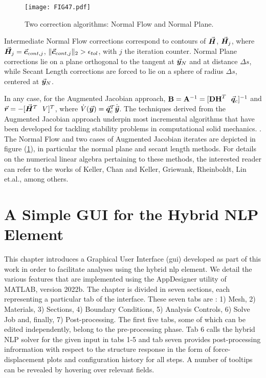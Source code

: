 \begin{appendices}
\begin{figure}[t]
	\centering
	\texttt{[image: FIG47.pdf]}
	\caption{Two correction algorithms: Normal Flow and Normal Plane.}
	\label{fig:FIG47}
\end{figure}

Intermediate Normal Flow corrections correspond to
contours of $\vec{\bm{H}}$, $\vec{\bm{H}}_j$, where $\vec{\bm{H}}_j=\vec{\bm{c}}_{cont,j}$, 
$\Vert
\vec{\bm{c}}_{cont,j}\Vert_2>\epsilon_{tol}$, with $j$ the iteration counter. 
Normal Plane
corrections lie on a plane orthogonal to the tangent at $\vec{\bm{y}}_N$ and at
distance $\Delta s$, while Secant Length corrections are forced to lie on a
sphere of radius $\Delta s$, centered at $\vec{\bm{y}}_N$.

In any case, for the Augmented Jacobian approach,  $\mathbf{B} = 
\mathbf{A}^{-1}=[\mathbf{DH}^T\ \ \vec{\bm{q}}_c]^{-1}$ and
$\vec{\bm{r}} = -[\vec{\bm{H}}^T\ \ V]^T$, where
$\dot{V}(\vec{\bm{y}})=\vec{\bm{q}}_c^T\dot{\vec{\bm{y}}}$.
The techniques derived from the Augmented Jacobian
approach underpin most incremental algorithms that have been developed 
for tackling stability problems in computational solid mechanics.
\cite{Wempner:1971,Riks:1972,Riks:1979,Crisfield3,Ramm:1981}. The Normal
Flow and two cases of Augmented Jacobian iterates are depicted in 
figure (\ref{fig:FIG47}), in particular the normal plane and secant length
methods. For details on the numerical linear algebra pertaining to these
methods, the interested reader can refer to the works of 
Keller\cite{Keller:1978,Keller:1983}, 
Chan and Keller\cite{ChanKeller:1982}, Griewank\cite{Griewank:1985},
Rheinboldt\cite{Rheinboldt:1983B}, Lin et.al.\cite{Lin:1987}, among others. 


\chapter{A Simple GUI for the Hybrid NLP Element}\label{appendix:APPENDIX_G}


This chapter introduces a Graphical User Interface (\acrshort{gui}) developed 
as part of 
this work in order to 
facilitate analyses using the hybrid \acrshort{nlp} element. We detail the 
various features that are implemented using the AppDesigner utility of MATLAB, 
version 2022b. The chapter is divided in seven sections, each representing a 
particular tab of the interface. These seven tabs are : 1) Mesh, 2) Materials, 
3) Sections, 4) Boundary Conditions, 5) Analysis Controls, 6) Solve Job and, 
finally, 7) Post-processing. The first five tabs, some of which can be edited 
independently, belong to the pre-processing phase. Tab 6 calls the hybrid NLP 
solver for the given input in tabs 1-5 and tab seven provides post-processing 
infrormation with respect to the structure response in the form of 
force-displacement plots and  configuration history for all steps. A number of 
tooltips can be revealed by hovering over relevant fields.


\end{appendices}
